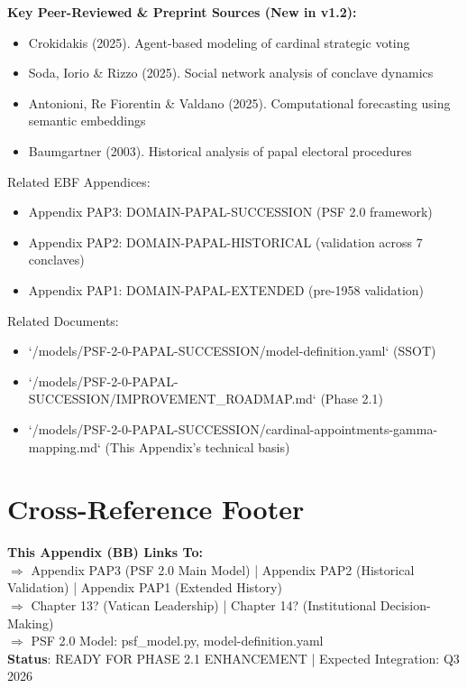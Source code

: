\noindent
\textbf{Key Peer-Reviewed & Preprint Sources (New in v1.2):}
\begin{itemize}
\item \nocite{crokidakis2025conclave} Crokidakis (2025). Agent-based modeling of cardinal strategic voting
\item \nocite{soda2025network} Soda, Iorio \& Rizzo (2025). Social network analysis of conclave dynamics
\item \nocite{antonioni2025totopapa} Antonioni, Re Fiorentin \& Valdano (2025). Computational forecasting using semantic embeddings
\item \nocite{baumgartner2003locked} Baumgartner (2003). Historical analysis of papal electoral procedures
\end{itemize}

\noindent
Related EBF Appendices:
\begin{itemize}
\item Appendix PAP3: DOMAIN-PAPAL-SUCCESSION (PSF 2.0 framework)
\item Appendix PAP2: DOMAIN-PAPAL-HISTORICAL (validation across 7 conclaves)
\item Appendix PAP1: DOMAIN-PAPAL-EXTENDED (pre-1958 validation)
\end{itemize}

\noindent
Related Documents:
\begin{itemize}
\item `/models/PSF-2-0-PAPAL-SUCCESSION/model-definition.yaml` (SSOT)
\item `/models/PSF-2-0-PAPAL-SUCCESSION/IMPROVEMENT_ROADMAP.md` (Phase 2.1)
\item `/models/PSF-2-0-PAPAL-SUCCESSION/cardinal-appointments-gamma-mapping.md` (This Appendix's technical basis)
\end{itemize}

\section*{Cross-Reference Footer}

\begin{center}
\colorbox{yellow!20}{\begin{minipage}{0.95\textwidth}
\small
\textbf{This Appendix (BB) Links To:} \\
$\Rightarrow$ Appendix PAP3 (PSF 2.0 Main Model) | Appendix PAP2 (Historical Validation) | Appendix PAP1 (Extended History) \\
$\Rightarrow$ Chapter 13? (Vatican Leadership) | Chapter 14? (Institutional Decision-Making) \\
$\Rightarrow$ PSF 2.0 Model: psf\_model.py, model-definition.yaml \\
\textbf{Status}: READY FOR PHASE 2.1 ENHANCEMENT | Expected Integration: Q3 2026
\end{minipage}}
\end{center}


